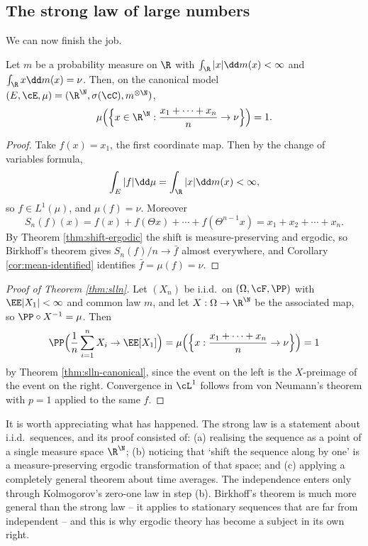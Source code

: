 \subsection{The strong law of large numbers}

We can now finish the job.

\begin{theorem}\label{thm:slln-canonical}
	Let $m$ be a probability measure on $\R$ with $\int_\R|x|\dd m(x)<\infty$ and $\int_\R x\dd m(x)=\nu$. Then, on the canonical model $(E,\cE,\mu)=(\R^\N,\sigma(\cC),m^{\otimes\N})$,
	$$
	\mu\Big(\Big\{ x \in \R^\N : \frac{x_1+\cdots+x_n}{n}\to\nu\Big\}\Big)=1.
	$$
\end{theorem}
\begin{proof}
	Take $f(x)=x_1$, the first coordinate map. Then by the change of variables formula,
	$$
	\int_E |f|\dd\mu = \int_\R |x|\dd m(x)<\infty,
	$$
	so $f \in L^1(\mu)$, and $\mu(f)=\nu$. Moreover
	$$
	S_n(f)(x)= f(x)+f(\Theta x)+\cdots+f(\Theta^{n-1}x)=x_1+x_2+\cdots+x_n.
	$$
	By Theorem \ref{thm:shift-ergodic} the shift is measure-preserving and ergodic, so Birkhoff's theorem gives $S_n(f)/n\to\bar f$ almost everywhere, and Corollary \ref{cor:mean-identified} identifies $\bar f = \mu(f)=\nu$.
\end{proof}

\begin{proof}[Proof of Theorem \ref{thm:slln}]
	Let $(X_n)$ be i.i.d.\ on $(\Omega,\cF,\PP)$ with $\EE|X_1|<\infty$ and common law $m$, and let $X : \Omega \to \R^\N$ be the associated map, so $\PP\circ X^{-1}=\mu$. Then
	$$
	\PP\Big(\frac1n\sum_{i=1}^nX_i \to \EE[X_1]\Big) = \mu\Big(\Big\{x : \frac{x_1+\cdots+x_n}{n}\to\nu\Big\}\Big)=1
	$$
	by Theorem \ref{thm:slln-canonical}, since the event on the left is the $X$-preimage of the event on the right. Convergence in $\cL^1$ follows from von Neumann's theorem with $p=1$ applied to the same $f$.
\end{proof}

\begin{remark}
	It is worth appreciating what has happened. The strong law is a statement about i.i.d.\ sequences, and its proof consisted of: (a) realising the sequence as a point of a single measure space $\R^\N$; (b) noticing that `shift the sequence along by one' is a measure-preserving ergodic transformation of that space; and (c) applying a completely general theorem about time averages. The independence enters only through Kolmogorov's zero-one law in step (b). Birkhoff's theorem is much more general than the strong law -- it applies to stationary sequences that are far from independent -- and this is why ergodic theory has become a subject in its own right.
\end{remark}

